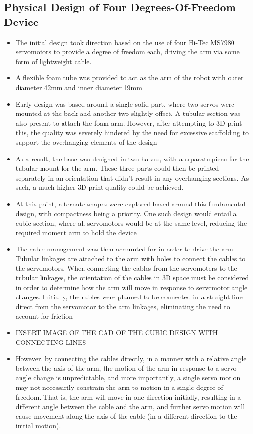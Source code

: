 \documentclass[11pt]{article}
\begin{document}
\subsection{Physical Design of Four Degrees-Of-Freedom Device}
\begin{itemize}
\item{The initial design took direction based on the use of four Hi-Tec MS7980 servomotors to provide a degree of freedom each, driving the arm via some form of lightweight cable.}
\item{A flexible foam tube was provided to act as the arm of the robot with outer diameter 42mm and inner diameter 19mm}
\item{Early design was based around a single solid part, where two servos were mounted at the back and another two slightly offset. A tubular section was also present to attach the foam arm. However, after attempting to 3D print this, the quality was severely hindered by the need for excessive scaffolding to support the overhanging elements of the design}
\item{As a result, the base was designed in two halves, with a separate piece for the tubular mount for the arm. These three parts could then be printed separately in an orientation that didn't result in any overhanging sections. As such, a much higher 3D print quality could be achieved.}
\item{At this point, alternate shapes were explored based around this fundamental design, with compactness being a priority. One such design would entail a cubic section, where all servomotors would be at the same level, reducing the required moment arm to hold the device}
\item{The cable management was then accounted for in order to drive the arm. Tubular linkages are attached to the arm with holes to connect the cables to the servomotors. When connecting the cables from the servomotors to the tubular linkages, the orientation of the cables in 3D space must be considered in order to determine how the arm will move in response to servomotor angle changes. Initially, the cables were planned to be connected in a straight line direct from the servomotor to the arm linkages, eliminating the need to account for friction}
\item{INSERT IMAGE OF THE CAD OF THE CUBIC DESIGN WITH CONNECTING LINES}
\item{However, by connecting the cables directly, in a manner with a relative angle between the axis of the arm, the motion of the arm in response to a servo angle change is unpredictable, and more importantly, a single servo motion may not necessarily constrain the arm to motion in a single degree of freedom. That is, the arm will move in one direction initially, resulting in a different angle between the cable and the arm, and further servo motion will cause movement along the axis of the cable (in a different direction to the initial motion). }

\end{itemize}
\end{document}
